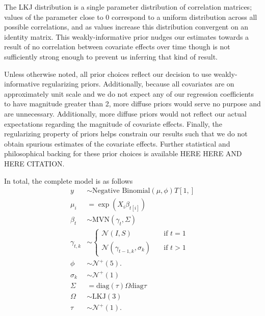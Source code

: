 \documentclass[12pt,letterpaper]{article}
\begin{document}
The LKJ distribution is a single parameter distribution of correlation matrices; values of the parameter close to 0 correspond to a uniform distribution across all possible correlations, and as values increase this distribution convergent on an identity matrix. This weakly-informative prior nudges our estimates towards a result of no correlation between covariate effects over time though is not sufficiently strong enough to prevent us inferring that kind of result.

Unless otherwise noted, all prior choices reflect our decision to use weakly-informative regularizing priors. Additionally, because all covariates are on approximately unit scale and we do not expect any of our regression coefficients to have magnitude greater than 2, more diffuse priors would serve no purpose and are unnecessary. Additionally, more diffuse priors would not reflect our actual expectations regarding the magnitude of covariate effects. Finally, the regularizing property of priors helps constrain our results such that we do not obtain spurious estimates of the covariate effects. Further statistical and philosophical backing for these prior choices is available HERE HERE AND HERE CITATION.

In total, the complete model is as follows
\begin{equation}
  \begin{aligned}
    y &\sim \text{Negative Binomial}(\mu, \phi) T[1, ] \\
    \mu_{i} &= \exp(X_{i} \beta_{t[i]}) \\
    \beta_{t} &\sim \text{MVN}(\gamma_{t}, \Sigma) \\
    \gamma_{t, k} &\sim 
      \begin{cases}
        \mathcal{N}(I, S) & \quad \text{if } t = 1 \\
        \mathcal{N}(\gamma_{t - 1, k}, \sigma_{k}) & \quad \text{if } t > 1
      \end{cases} \\
    \phi &\sim \mathcal{N}^{+}(5). \\
    \sigma_{k} &\sim \mathcal{N}^{+}(1) \\ 
    \Sigma &= \text{diag}(\tau) \Omega \text{diag}{\tau} \\
    \Omega &\sim \text{LKJ}(3) \\
    \tau &\sim \mathcal{N}^{+}(1). \\
  \end{aligned}
\end{equation}
\end{document}
